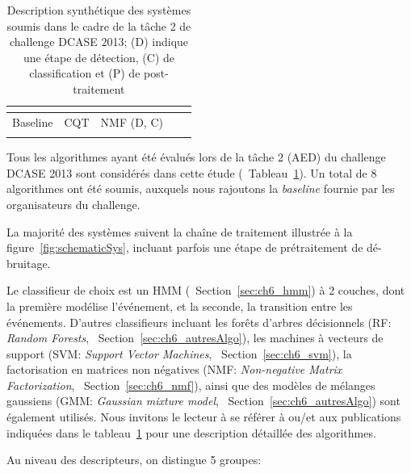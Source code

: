 \begin{table}[t]
\begin{center}
\begin{tabular}{lcccc}
\citep{VVK,gemmeke2013exemplar}     &                      &                              &           &             \\    
\hline
Baseline                            & CQT                  & NMF \hfill  (D, C)           &           &             \\ 
\citep{Giannoulis:2013a}            &                      &                              &           &             \\  
\hline      
\end{tabular}
\end{center}
\caption[Description synthétique des systèmes soumis dans le cadre de la tâche 2 de challenge DCASE 2013]{Description synthétique des systèmes soumis dans le cadre de la tâche 2 de challenge DCASE 2013; (D) indique une étape de détection, (C) de classification et (P) de post-traitement}
\label{tab:systemsDcase2013}
\end{table}

Tous les algorithmes ayant été évalués lors de la tâche 2 (AED) du challenge DCASE 2013 sont considérés dans cette étude (\cf~Tableau~\ref{tab:systemsDcase2013}). Un total de 8 algorithmes ont été soumis, auxquels nous rajoutons la \emph{baseline} fournie par les organisateurs du challenge.

La majorité des systèmes suivent la chaîne de traitement illustrée à la figure~\ref{fig:schematicSys}, incluant parfois une étape de prétraitement de dé-bruitage.

Le classifieur de choix est un HMM (\cf~Section~\ref{sec:ch6_hmm}) à 2 couches, dont la première modélise l'événement, et la seconde, la transition entre les événements. D'autres classifieurs incluant les forêts d'arbres décisionnels (RF: \emph{Random Forests}, \cf~Section~\ref{sec:ch6_autresAlgo}), les machines à vecteurs de support (SVM: \emph{Support Vector Machines}, \cf~Section~\ref{sec:ch6_svm}), la factorisation en matrices non négatives (NMF: \emph{Non-negative Matrix Factorization}, \cf~Section~\ref{sec:ch6_nmf}), ainsi que des modèles de mélanges gaussiens (GMM: \emph{Gaussian mixture model}, \cf~Section~\ref{sec:ch6_autresAlgo}) sont également utilisés. Nous invitons le lecteur à se référer à \citep{Stowell15} ou/et aux publications indiquées dans le tableau~\ref{tab:systemsDcase2013} pour une description détaillée des algorithmes.

Au niveau des descripteurs, on distingue 5 groupes:

